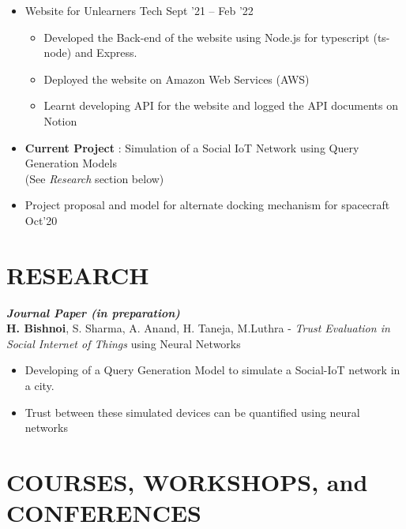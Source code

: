 \documentclass[11pt]{res} %
\newcommand{\titlegap}{5pt} %
\newcommand{\sectgap}{0.05in} %
\begin{document}
\begin{resume}
\begin{itemize}
    \item Website for Unlearners Tech \hfill Sept '21 -- Feb '22
    \begin{itemize}
        \item Developed the Back-end of the website using Node.js for typescript (ts-node) and Express.
        \item Deployed the website on Amazon Web Services (AWS)
        \item Learnt developing API for the website and logged the API documents on Notion 
    \end{itemize}
    \item \textbf{Current Project} : Simulation of a Social IoT Network using Query Generation Models \\ (See \textit{Research} section below) \hfill 
    
    
    \item Project proposal and model for alternate docking mechanism for spacecraft \hfill Oct'20

\end{itemize}
\vspace{\sectgap} 
 
 \vspace{0.25in}
 \hline
 \section{\large RESEARCH}

\vspace{\titlegap}

\textbf{\textit{Journal Paper (in preparation)}}\\
\textbf{H. Bishnoi}, S. Sharma, A. Anand, H. Taneja, M.Luthra - \textit{Trust Evaluation in Social Internet of Things} using Neural Networks\\
   \begin{itemize}
        \item Developing of a Query Generation Model to simulate a Social-IoT network in a city.
        \item Trust between these simulated devices can be quantified using neural networks
    \end{itemize}
    
\vspace{0.25in}
\hline

\section{COURSES, WORKSHOPS, and CONFERENCES}


\end{resume}
\end{document}
